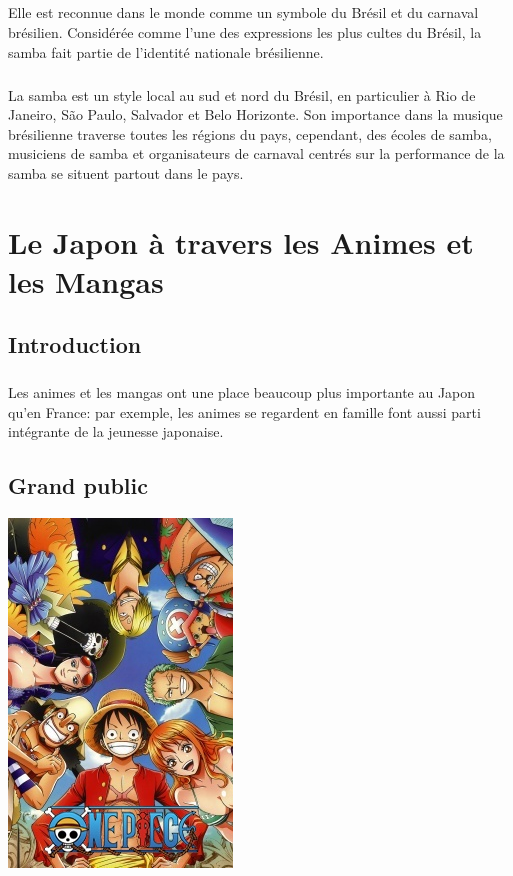 \paragraph{} Elle est reconnue dans le monde comme un symbole du Brésil et du
carnaval brésilien. Considérée comme l'une des expressions les plus cultes du
Brésil, la samba fait partie de l'identité nationale brésilienne.

\paragraph{} La samba est un style local au sud et nord du Brésil, en
particulier à Rio de Janeiro, São Paulo, Salvador et Belo Horizonte. Son
importance dans la musique brésilienne traverse toutes les régions du pays,
cependant, des écoles de samba, musiciens de samba et organisateurs de carnaval
centrés sur la performance de la samba se situent partout dans le pays.

\chapter[Les Animes et les Mangas]{Le Japon à travers les Animes et les Mangas}

\section{Introduction}

\paragraph{} Les animes et les mangas ont une place beaucoup plus importante au
Japon qu'en France: par exemple, les animes se regardent en famille font aussi
parti intégrante de la jeunesse japonaise.

\section{Grand public}

\begin{center}
	\centering
	\includegraphics[scale=0.6]{OnePiece.jpg}
\end{center}

